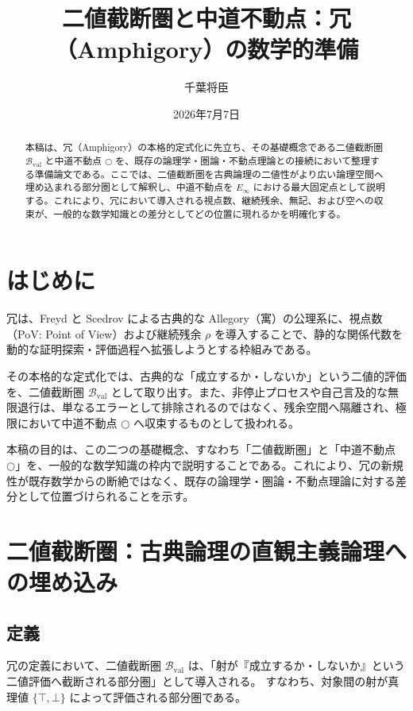 \documentclass[a4paper,11pt]{article}
\title{二値截断圏と中道不動点：冗（Amphigory）の数学的準備}
\author{千葉将臣}
\date{2026年7月7日}
\newcommand{\dfix}{\bigcirc}
\begin{document}
\maketitle

\begin{abstract}
本稿は、冗（Amphigory）の本格的定式化に先立ち、その基礎概念である二値截断圏 $\mathcal{B}_{\mathrm{val}}$ と中道不動点 $\dfix$ を、既存の論理学・圏論・不動点理論との接続において整理する準備論文である。ここでは、二値截断圏を古典論理の二値性がより広い論理空間へ埋め込まれる部分圏として解釈し、中道不動点を $E_\infty$ における最大固定点として説明する。これにより、冗において導入される視点数、継続残余、無記、および空への収束が、一般的な数学知識との差分としてどの位置に現れるかを明確化する。
\end{abstract}

\section{はじめに}
冗は、Freyd と Scedrov による古典的な Allegory（寓）の公理系に、視点数（PoV: Point of View）および継続残余 $\rho$ を導入することで、静的な関係代数を動的な証明探索・評価過程へ拡張しようとする枠組みである。

その本格的な定式化では、古典的な「成立するか・しないか」という二値的評価を、二値截断圏 $\mathcal{B}_{\mathrm{val}}$ として取り出す。また、非停止プロセスや自己言及的な無限退行は、単なるエラーとして排除されるのではなく、残余空間へ隔離され、極限において中道不動点 $\dfix$ へ収束するものとして扱われる。

本稿の目的は、この二つの基礎概念、すなわち「二値截断圏」と「中道不動点 $\dfix$」を、一般的な数学知識の枠内で説明することである。これにより、冗の新規性が既存数学からの断絶ではなく、既存の論理学・圏論・不動点理論に対する差分として位置づけられることを示す。

\section{二値截断圏：古典論理の直観主義論理への埋め込み}

\subsection{定義}
冗の定義において、二値截断圏 $\mathcal{B}_{\mathrm{val}}$ は、「射が『成立するか・しないか』という二値評価へ截断される部分圏」として導入される。
すなわち、対象間の射が真理値 $\{\top, \bot\}$ によって評価される部分圏である。
\end{document}
